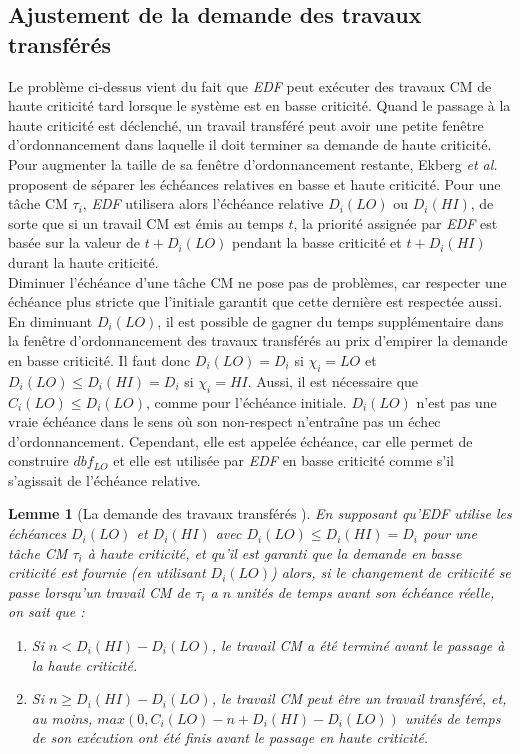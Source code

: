 \documentclass[12pt,a4paper,oneside]{book}
\theoremstyle{break}
\theoremstyle{breakplain}
\newtheorem{lem}{Lemme}[chapter]
\begin{document}
\subsection{Ajustement de la demande des travaux transférés}
Le problème ci-dessus vient du fait que \textit{EDF} peut exécuter des travaux CM de haute criticité tard lorsque le système est en basse criticité. Quand le passage à la haute criticité est déclenché, un travail transféré peut avoir une petite fenêtre d'ordonnancement dans laquelle il doit terminer sa demande de haute criticité.\\
Pour augmenter la taille de sa fenêtre d'ordonnancement restante, Ekberg \textit{et al.} proposent de séparer les échéances relatives en basse et haute criticité. Pour une tâche CM $\tau_i$, \textit{EDF} utilisera alors l'échéance relative $D_i(LO)$ ou $D_i(HI)$, de sorte que si un travail CM est émis au temps $t$, la priorité assignée par \textit{EDF} est basée sur la valeur de $t+D_i(LO)$ pendant la basse criticité et $t+D_i(HI)$ durant la haute criticité.\\

Diminuer l'échéance d'une tâche CM ne pose pas de problèmes, car respecter une échéance plus stricte que l'initiale garantit que cette dernière est respectée aussi. En diminuant $D_i(LO)$, il est possible de gagner du temps supplémentaire dans la fenêtre d'ordonnancement des travaux transférés au prix d'empirer la demande en basse criticité. Il faut donc $D_i(LO) = D_i$ si $\chi_i = LO$ et $D_i(LO) \le D_i(HI) = D_i$ si $\chi_i = HI$. Aussi, il est nécessaire que $C_i(LO) \le D_i(LO)$, comme pour l'échéance initiale. $D_i(LO)$ n'est pas une vraie échéance dans le sens où son non-respect n'entraîne pas un échec d'ordonnancement. Cependant, elle est appelée échéance, car elle permet de construire $dbf_{LO}$ et elle est utilisée par \textit{EDF} en basse criticité comme s'il s'agissait de l'échéance relative.

\begin{lem}[La demande des travaux transférés \cite{ekberg2012outstanding}]
\label{greedy:dtt}
En supposant qu'\textit{EDF} utilise les échéances $D_i(LO)$ et $D_i(HI)$ avec $D_i(LO) \le D_i(HI) = D_i$ pour une tâche CM $\tau_i$ à haute criticité, et qu'il est garanti que la demande en basse criticité est fournie (en utilisant $D_i(LO)$) alors, si le changement de criticité se passe lorsqu'un travail CM de $\tau_i$ a $n$ unités de temps avant son échéance réelle, on sait que :
\begin{enumerate}
\item  Si $n < D_i(HI) - D_i(LO)$, le travail CM a été terminé avant le passage à la haute criticité.\\
\item Si $n \ge D_i(HI)-D_i(LO)$, le travail CM peut être un travail transféré, et, au moins, $max \left(0, C_i(LO) - n + D_i(HI) - D_i(LO)\right)$ unités de temps de son exécution ont été finis avant le passage en haute criticité.
\end{enumerate}
\end{lem}
\end{document}
